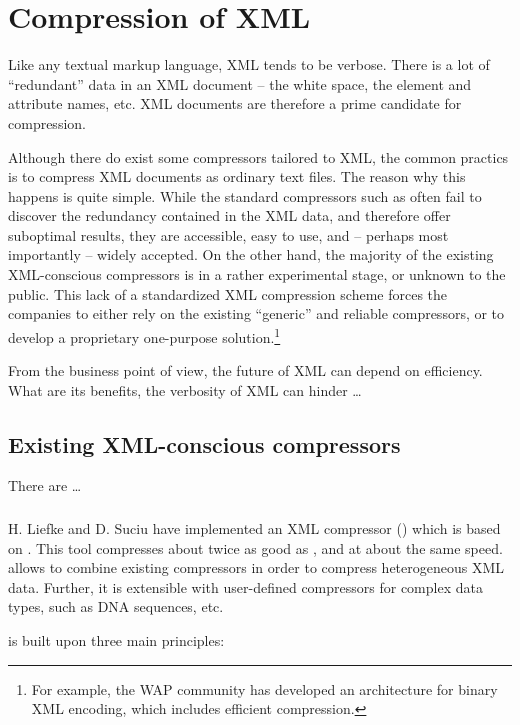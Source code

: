 \chapter{Compression of XML}
Like any textual markup language, XML tends to be verbose. There is a lot of ``redundant'' data in an XML document -- the white space, the element and attribute names, etc. XML documents are therefore a prime candidate for compression.

Although there do exist some compressors tailored to XML, the common practics is to compress XML documents as ordinary text files. The reason why this happens is quite simple. While the standard compressors such as  often fail to discover the redundancy contained in the XML data, and therefore offer suboptimal results, they are accessible, easy to use, and -- perhaps most importantly -- widely accepted. On the other hand, the majority of the existing XML-conscious compressors is in a rather experimental stage, or unknown to the public. This lack of a standardized XML compression scheme forces the companies to either rely on the existing ``generic'' and reliable compressors, or to develop a proprietary one-purpose solution.\footnote{For example, the WAP community \cite{WAPForum} has developed an architecture for binary XML encoding, which includes efficient compression.}

From the business point of view, the future of XML can depend on efficiency. What are its benefits, the verbosity of XML can hinder \dots 

\section{Existing XML-conscious compressors}
There are \dots

\subsection{}
H. Liefke and D. Suciu \cite{Liefke-00} have implemented an XML compressor () which is based on . This tool compresses about twice as good as , and at about the same speed.  allows to combine existing compressors in order to compress heterogeneous XML data. Further, it is extensible with user-defined compressors for complex data types, such as DNA sequences, etc.

 is built upon three main principles:

